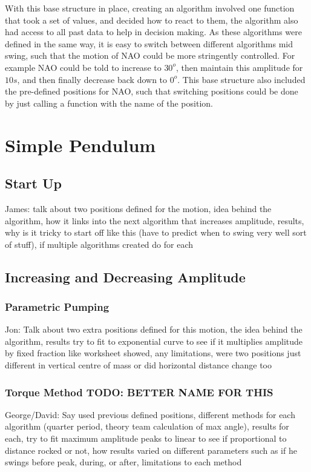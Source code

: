 \documentclass[11pt]{article}
\begin{document}
With this base structure in place, creating an algorithm involved one function that took a set of values, and decided how to react to them, the algorithm also had access to all past data to help in decision making. As these algorithms were defined in the same way, it is easy to switch between different algorithms mid swing, such that the motion of NAO could be more stringently controlled. For example NAO could be told to increase to $30^o$, then maintain this amplitude for $10s$, and then finally decrease back down to $0^o$.  This base structure also included the pre-defined positions for NAO, such that switching positions could be done by just calling a function with the name of the position.

\section{Simple Pendulum}
\subsection{Start Up}
James: talk about two positions defined for the motion, idea behind the algorithm, how it links into the next algorithm that increases amplitude, results, why is it tricky to start off like this (have to predict when to swing very well sort of stuff), if multiple algorithms created do for each

\subsection{Increasing and Decreasing Amplitude}
\subsubsection{Parametric Pumping}
Jon: Talk about two extra positions defined for this motion, the idea behind the algorithm, results try to fit to exponential curve to see if it multiplies amplitude by fixed fraction like worksheet showed, any limitations, were two positions just different in vertical centre of mass or did horizontal distance change too
\subsubsection{Torque Method TODO: BETTER NAME FOR THIS}
George/David: Say used previous defined positions, different methods for each algorithm (quarter period, theory team calculation of max angle), results for each, try to fit maximum amplitude peaks to linear to see if proportional to distance rocked or not, how results varied on different parameters such as if he swings before peak, during, or after, limitations to each method
\end{document}
